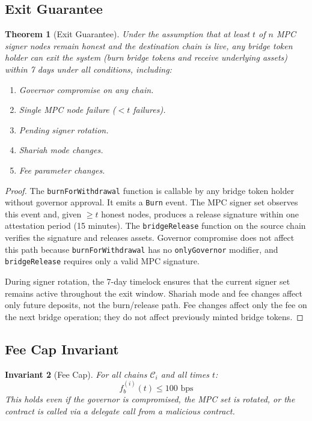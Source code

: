 \documentclass[11pt,twocolumn]{article}
\newtheorem{theorem}{Theorem}[section]
\newtheorem{invariant}[theorem]{Invariant}
\theoremstyle{definition}
\newcommand{\Chain}{\mathcal{C}}
\begin{document}
\subsection{Exit Guarantee}

\begin{theorem}[Exit Guarantee]
\label{thm:exit}
Under the assumption that at least $t$ of $n$ MPC signer nodes remain honest and the destination chain is live, any bridge token holder can exit the system (burn bridge tokens and receive underlying assets) within 7 days under all conditions, including:
\begin{enumerate}[nosep]
  \item Governor compromise on any chain.
  \item Single MPC node failure ($< t$ failures).
  \item Pending signer rotation.
  \item Shariah mode changes.
  \item Fee parameter changes.
\end{enumerate}
\end{theorem}

\begin{proof}
The \texttt{burnForWithdrawal} function is callable by any bridge token holder without governor approval. It emits a \texttt{Burn} event. The MPC signer set observes this event and, given $\geq t$ honest nodes, produces a release signature within one attestation period (15 minutes). The \texttt{bridgeRelease} function on the source chain verifies the signature and releases assets. Governor compromise does not affect this path because \texttt{burnForWithdrawal} has no \texttt{onlyGovernor} modifier, and \texttt{bridgeRelease} requires only a valid MPC signature.

During signer rotation, the 7-day timelock ensures that the current signer set remains active throughout the exit window. Shariah mode and fee changes affect only future deposits, not the burn/release path. Fee changes affect only the fee on the next bridge operation; they do not affect previously minted bridge tokens.
\end{proof}

\subsection{Fee Cap Invariant}

\begin{invariant}[Fee Cap]
\label{inv:feecap}
For all chains $\Chain_i$ and all times $t$:
\begin{equation}
  f_b^{(i)}(t) \leq 100 \text{ bps}
\end{equation}
This holds even if the governor is compromised, the MPC set is rotated, or the contract is called via a delegate call from a malicious contract.
\end{invariant}
\end{document}
